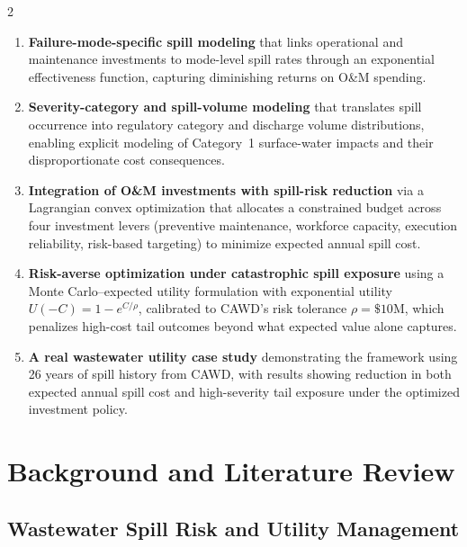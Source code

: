 \documentclass[10pt]{article}
\begin{document}
\begin{multicols}{2}
\begin{enumerate}[leftmargin=*]
    \item \textbf{Failure-mode-specific spill modeling} that links
    operational and maintenance investments to mode-level spill rates
    through an exponential effectiveness function, capturing diminishing
    returns on O\&M spending.
 
    \item \textbf{Severity-category and spill-volume modeling} that
    translates spill occurrence into regulatory category and discharge
    volume distributions, enabling explicit modeling of Category~1
    surface-water impacts and their disproportionate cost consequences.
 
    \item \textbf{Integration of O\&M investments with spill-risk
    reduction} via a Lagrangian convex optimization that allocates a
    constrained budget across four investment levers (preventive
    maintenance, workforce capacity, execution reliability, risk-based
    targeting) to minimize expected annual spill cost.
 
    \item \textbf{Risk-averse optimization under catastrophic spill
    exposure} using a Monte Carlo--expected utility formulation with
exponential utility $U(-C) = 1 - e^{C/\rho}$, calibrated to CAWD's
risk tolerance $\rho = \$10$M, which penalizes high-cost tail
outcomes beyond what expected value alone captures.
 
    \item \textbf{A real wastewater utility case study} demonstrating
    the framework using 26 years of spill history from CAWD, with
    results showing reduction in both expected annual spill cost and
    high-severity tail exposure under the optimized investment policy.
\end{enumerate}
 
\section{Background and Literature Review}
 
\subsection{Wastewater Spill Risk and Utility Management}



\end{multicols}
\end{document}
